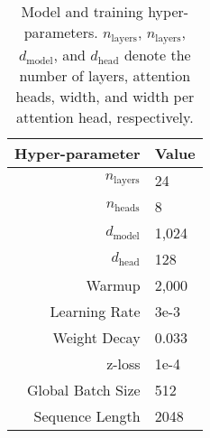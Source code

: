 \begin{table}
    \centering
    \begin{tabular}{rl}
    \toprule
        \textbf{Hyper-parameter} & \textbf{Value}\\
    \midrule
         $n_{\text{layers}}$ & 24 \\
         $n_{\text{heads}}$& 8\\
         $d_{\text{model}}$& 1,024\\
         $d_{\text{head}}$& 128\\
         Warmup& 2,000\\
         Learning Rate& 3e-3\\
         Weight Decay& 0.033\\
         z-loss& 1e-4\\
         Global Batch Size & 512 \\
         Sequence Length & 2048 \\
    \bottomrule
    \end{tabular}
    \caption{Model and training hyper-parameters.
    $n_{\text{layers}}$, $n_{\text{layers}}$, $d_{\text{model}}$, and $d_{\text{head}}$ denote the number of layers, attention heads, width, and width per attention head, respectively.
    }
    \label{tab:hyperparameters}
\end{table}